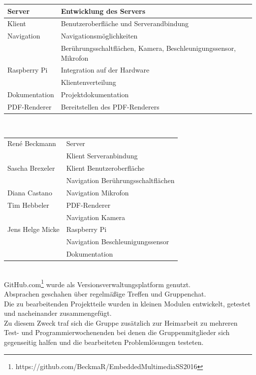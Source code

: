 \begin{tabular}{|l|l|}
	\hline
	Server & Entwicklung des Servers\\
	\hline
	Klient & Benutzeroberfläche und Serverandbindung \\
	\hline
	Navigation & Navigationsmöglichkeiten\\
	& Berührungsschaltflächen, Kamera, Beschleunigungssensor, Mikrofon\\
	\hline
	Raspberry Pi & Integration auf der Hardware\\
	& Klientenverteilung\\
	\hline
	Dokumentation & Projektdokumentation\\
	\hline
	PDF-Renderer & Bereitstellen des PDF-Renderers\\
	\hline
\end{tabular}
\\
\begin{tabular}{|l|l|}
	\hline
	René Beckmann & Server\\
	& Klient Serveranbindung\\
	\hline
	Sascha Brexeler & Klient Benutzeroberfläche\\
	& Navigation Berührungsschaltflächen\\
	\hline
	Diana Castano & Navigation Mikrofon\\
	\hline
	Tim Hebbeler & PDF-Renderer\\
	& Navigation Kamera\\
	\hline
	Jens Helge Micke & Raspberry Pi\\
	& Navigation Beschleunigungssensor\\
	& Dokumentation\\
	\hline
\end{tabular}
\\
GitHub.com\footnote{https://github.com/BeckmaR/EmbeddedMultimediaSS2016} wurde als Versionsverwaltungsplatform genutzt.\\
Absprachen geschahen über regelmäßige Treffen und Gruppenchat.\\
Die zu bearbeitenden Projektteile wurden in kleinen Modulen entwickelt, getestet und nacheinander zusammengefügt.\\
Zu diesem Zweck traf sich die Gruppe zusätzlich zur Heimarbeit zu mehreren Test- und Programmierwochenenden bei denen die Gruppenmitglieder sich gegenseitig halfen und die bearbeiteten Problemlösungen testeten.\\